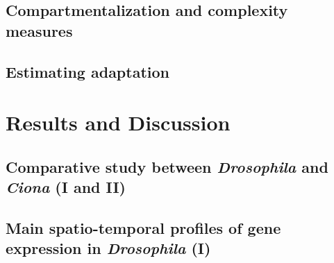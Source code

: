 \documentclass[officiallayout]{tktla_modified}
\begin{document}
	\section{Compartmentalization and complexity measures}
	


	\section{Estimating adaptation}
%	

%
\clearpage

	
\chapter{Results and Discussion}

%	
%	

%	

\section{Comparative study between \textit{Drosophila} and \textit{Ciona} (I and II)}
	

\section{Main spatio-temporal profiles of gene expression in \textit{Drosophila} (I)}
	
\end{document}
